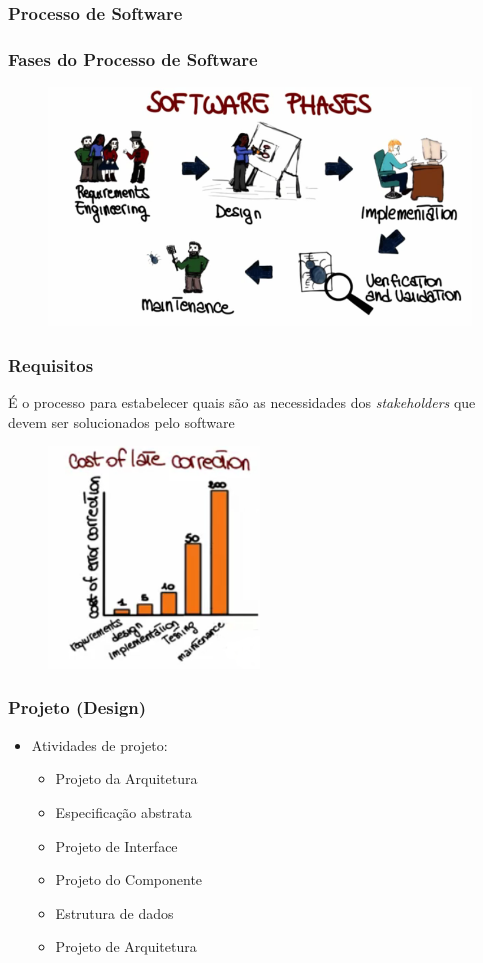 \begin{frame}
 \frametitle{Processo de Software}
\frametitle{Fases do Processo de Software}
\begin{figure}
 \includegraphics[width = \textwidth]{figs/fig20.png}
\end{figure}
\end{frame}

\begin{frame}
 \frametitle{Requisitos}
 \begin{block}{}
   É o processo para estabelecer quais são as necessidades dos \textit{stakeholders} que devem ser solucionados pelo software
 \end{block}
 \begin{figure}
 \includegraphics[width = 0.5\textwidth]{figs/fig22.png}
\end{figure}
\end{frame}

\begin{frame}
 \frametitle{Projeto (Design)}
\begin{itemize}
 \item Atividades de projeto:
 \begin{itemize}
  \item Projeto da Arquitetura
  \item Especificação abstrata
  \item Projeto de Interface
  \item Projeto do Componente
  \item Estrutura de dados
  \item Projeto de Arquitetura
 \end{itemize}
\end{itemize}

\end{frame}



